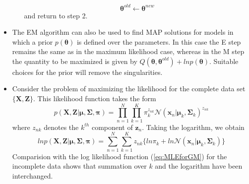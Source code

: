 \documentclass[12pt, a4paper]{article}
\newcommand{\N}{\mathcal{N}}
\begin{document}
\begin{itemize}
\begin{enumerate}
\begin{equation*}
                \bm{\theta}^{old}\leftarrow\bm{\theta}^{new}
            \end{equation*}
            and return to step 2. 
        \end{enumerate}
        \item The EM algorithm can also be used to find MAP solutions for models in which a 
        prior $p(\bm{\theta})$ is defined over the parameters. In this case the E step remains
        the same as in the maximum likelihood case, whereas in the M step the quantity to be 
        maximized is given by $Q(\bm{\theta},\bm{\theta}^{old})+lnp(\bm{\theta})$. Suitable 
        choices for the prior will remove the singularities. 
        \item Consider the problem of maximizing the likelihood for the complete data set 
        $\{\mathbf{X},\mathbf{Z}\}$. This likelihood function takes the form
        \begin{equation}
            p(\mathbf{X},\mathbf{Z}|\bm{\mu},\mathbf{\Sigma},\bm{\pi})=
            \prod_{n=1}^N\prod_{k=1}^K\pi^{z_{nk}}_k\N(\bm{x}_n|\bm{\mu}_k,
            \mathbf{\Sigma}_k)^{z_{nk}}
        \end{equation}
        where $z_{nk}$ denotes the $k^{th}$ component of $\bm{z}_n$. Taking the logarithm, we
        obtain
        \begin{equation}
            lnp(\mathbf{X},\mathbf{Z}|\bm{\mu},\mathbf{\Sigma},\bm{\pi})=
            \sum_{n=1}^N\sum_{k=1}^Kz_{nk}\{ln\pi_k+ln\N(\bm{x}_n|\bm{\mu}_k,\mathbf{\Sigma}_k)\}
        \end{equation}
        Comparision with the log likelihood function (\ref{eq:MLEforGM}) for the incomplete data
        shows that summation over $k$ and the logarithm have been interchanged. 
    \end{itemize}
\end{document}
